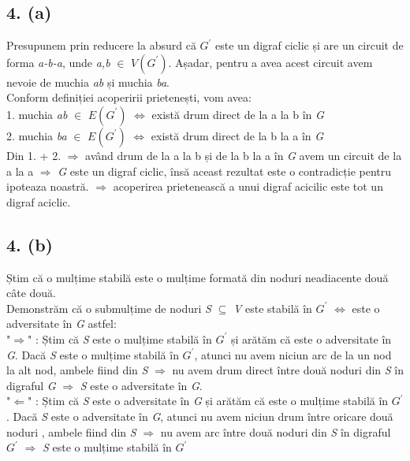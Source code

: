 \documentclass[12pt] {fphw}
\begin{document}
\subsection*{4. (a)} 
   Presupunem prin reducere la absurd că \textit{ ${}G^{'}$} este un digraf ciclic și are un circuit de forma  \textit{a-b-a}, unde \textit{a,b} $\in$ \textit{ ${}V( G^{'})$}. Așadar, pentru a avea acest circuit avem nevoie de muchia \textit{ab} și muchia \textit{ba}.\\
   Conform definiției acoperirii prietenești, vom avea:\\
1. muchia \textit{ab}  $\in$ \textit{ ${}E( G^{'})$} $\Leftrightarrow$ există drum direct de la a la b în \textit{G}\\
2. muchia \textit{ba}  $\in$ \textit{ ${}E( G^{'})$} $\Leftrightarrow$ există drum direct de la b la a în \textit{G}\\
Din 1. + 2. $\Rightarrow$  având drum de la a la b și de la b la a în \textit{G} avem un circuit de la a la a $\Rightarrow$ \textit{G} este un digraf ciclic, însă aceast rezultat este o contradicție pentru ipoteaza noastră.  $\Rightarrow$ acoperirea prietenească a unui digraf acicilic este tot un digraf aciclic. 

\subsection*{4. (b)}
   Știm că o mulțime stabilă este o mulțime formată din noduri neadiacente două câte două. \\ 
   Demonstrăm că o submulțime de noduri \textit{S} $\subseteq$ \textit{V} este stabilă în  \textit{ ${}G^{'}$} $\Leftrightarrow$ este o adversitate în \textit{G} astfel: \\
"$\Rightarrow$" :  Știm că \textit{S} este o mulțime stabilă în  \textit{ ${}G^{'}$} și arătăm că este o adversitate în \textit{G}. Dacă \textit{S} este o mulțime stabilă în \textit{ ${}G^{'}$}, atunci nu avem niciun arc de la un nod la alt nod, ambele fiind din \textit{S} $\Rightarrow$ nu avem drum direct între două noduri din  \textit{S} în digraful \textit{G} $\Rightarrow$  \textit{S} este o adversitate în \textit{G}. \\
"$\Leftarrow$" :  Știm că \textit{S} este o adversitate în \textit{G} și arătăm că este o mulțime stabilă în  \textit{ ${}G^{'}$}. Dacă \textit{S} este o adversitate în \textit{G}, atunci nu avem niciun drum între oricare două noduri , ambele fiind din \textit{S} $\Rightarrow$ nu avem arc între două noduri din \textit{S} în digraful \textit{ ${}G^{'}$} $\Rightarrow$ \textit{S} este o mulțime stabilă în  \textit{ ${}G^{'}$}
\end{document}
